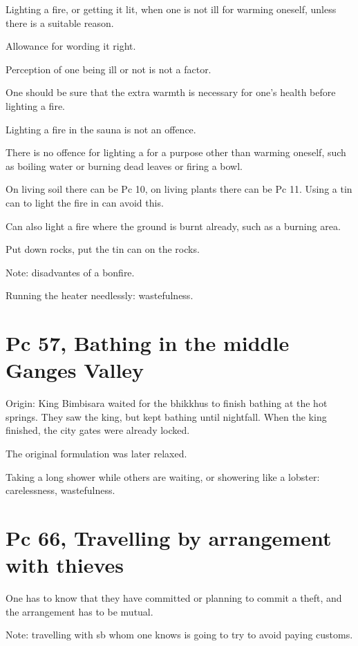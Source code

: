 \begin{multicols}{2}

Lighting a fire, or getting it lit, when one is not ill for warming
oneself, unless there is a suitable reason.

Allowance for wording it right.

Perception of one being ill or not is not a factor.

One should be sure that the extra warmth is necessary for one's health
before lighting a fire.

Lighting a fire in the sauna is not an offence.

There is no offence for lighting a for a purpose other than warming
oneself, such as boiling water or burning dead leaves or firing a bowl.

On living soil there can be Pc 10, on living plants there can be Pc 11.
Using a tin can to light the fire in can avoid this.

Can also light a fire where the ground is burnt already, such as a
burning area.

Put down rocks, put the tin can on the rocks.

Note: disadvantes of a bonfire.

Running the heater needlessly: wastefulness.

\end{multicols}

\section{Pc 57, Bathing in the middle Ganges Valley}

Origin: King Bimbisara waited for the bhikkhus to finish bathing at the
hot springs. They saw the king, but kept bathing until nightfall. When
the king finished, the city gates were already locked.

The original formulation was later relaxed.

Taking a long shower while others are waiting, or showering like a
lobster: carelessness, wastefulness.

\section{Pc 66, Travelling by arrangement with thieves}

One has to know that they have committed or planning to commit a theft,
and the arrangement has to be mutual.

Note: travelling with sb whom one knows is going to try to avoid paying
customs.


